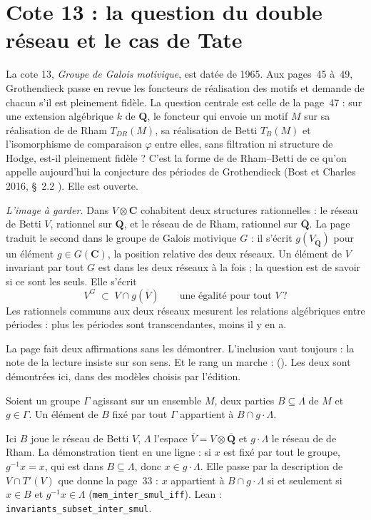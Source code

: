 \section[Cote 13 : la question du double réseau et le cas de Tate]{Cote 13 : la question du double réseau et le cas de Tate\protect{}}\label{sec:13}

La cote 13, \emph{Groupe de Galois motivique}, est datée de 1965. Aux pages~45 à~49, Grothendieck passe en revue les foncteurs de réalisation des motifs et demande de chacun s'il est pleinement fidèle. La question centrale est celle de la page~47 : sur une extension algébrique $k$ de $\mathbf Q$, le foncteur qui envoie un motif $M$ sur sa réalisation de de Rham $T_{DR}(M)$, sa réalisation de Betti $T_B(M)$ et l'isomorphisme de comparaison $\varphi$ entre elles, sans filtration ni structure de Hodge, est-il pleinement fidèle ? C'est la forme de de Rham--Betti de ce qu'on appelle aujourd'hui la conjecture des périodes de Grothendieck (Bost et Charles 2016, §~2.2 \cite{bostcharles2016}). Elle est ouverte.

\noindent\emph{L'image à garder.} Dans $V \otimes \mathbf C$ cohabitent deux structures rationnelles : le réseau de Betti $V$, rationnel sur $\mathbf Q$, et le réseau de de Rham, rationnel sur $\overline{\mathbf Q}$. La page traduit le second dans le groupe de Galois motivique $G$ : il s'écrit $g(V_{\overline{\mathbf Q}})$ pour un élément $g \in G(\mathbf C)$, la position relative des deux réseaux. Un élément de $V$ invariant par tout $G$ est dans les deux réseaux à la fois ; la question est de savoir si ce sont les seuls. Elle s'écrit
\[
V^G \;\subset\; V \cap g(\overline V) \qquad \text{une égalité pour tout } V \,?
\]
Les rationnels communs aux deux réseaux mesurent les relations algébriques entre périodes : plus les périodes sont transcendantes, moins il y en a.

La page fait deux affirmations sans les démontrer. L'inclusion vaut toujours : la note de la lecture insiste sur son sens. Et le rang un marche :  (). Les deux sont démontrées ici, dans des modèles choisis par l'édition.

\begin{enonce}
Soient un groupe $\Gamma$ agissant sur un ensemble $M$, deux parties $B \subseteq \Lambda$ de $M$ et $g \in \Gamma$. Un élément de $B$ fixé par tout $\Gamma$ appartient à $B \cap g \cdot \Lambda$.
\end{enonce}
Ici $B$ joue le réseau de Betti $V$, $\Lambda$ l'espace $\overline V = V \otimes \overline{\mathbf Q}$ et $g \cdot \Lambda$ le réseau de de Rham. La démonstration tient en une ligne : si $x$ est fixé par tout le groupe, $g^{-1}x = x$, qui est dans $B \subseteq \Lambda$, donc $x \in g \cdot \Lambda$. Elle passe par la description de $V \cap T'(V)$ que donne la page~33 : $x$ appartient à $B \cap g \cdot \Lambda$ si et seulement si $x \in B$ et $g^{-1}x \in \Lambda$ (\texttt{mem\_inter\_smul\_iff}). Lean : \texttt{invariants\_subset\_inter\_smul}.

